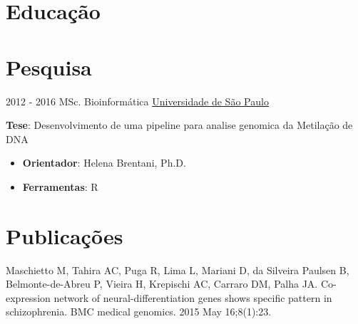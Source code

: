 \documentclass[letterpaper]{twentysecondcv} %
\begin{document}
\makeprofile %

\section{Educação}


\section{Pesquisa}
\begin{twenty}
	\twentyitem
    	{2012 - 2016}
		{}
        {MSc. Bioinformática}
        {\href{http://www5.usp.br/}{Universidade de São Paulo}}
        {}
        {
       	\textbf{Tese}: Desenvolvimento de uma pipeline para analise genomica da Metilação de DNA
        {\begin{itemize}
        \item \textbf{Orientador}: Helena Brentani, Ph.D.
        \item \textbf{Ferramentas}: R \vspace{2mm}
		\end{itemize}}
        }
\end{twenty}

\section{Publicações}

Maschietto M, Tahira AC, Puga R, Lima L, Mariani D, da Silveira Paulsen B, Belmonte-de-Abreu P, Vieira H, Krepischi AC, Carraro DM, Palha JA. Co-expression network of neural-differentiation genes shows specific pattern in schizophrenia. BMC medical genomics. 2015 May 16;8(1):23. \vspace{2mm}
\end{document}
